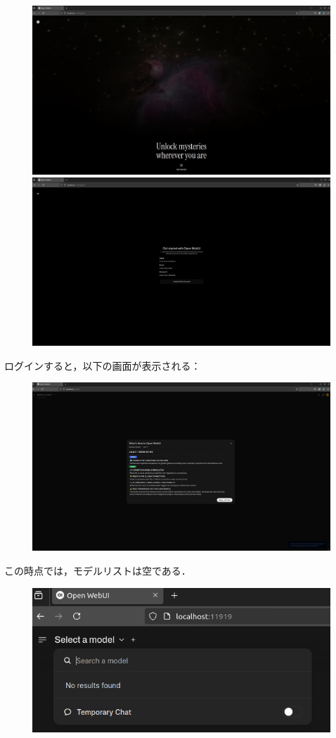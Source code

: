 \begin{figure}[H]
    \centering
    \includegraphics[width=0.8\linewidth]{images/Pasted image 20250304171521.png}
    \includegraphics[width=0.8\linewidth]{images/Pasted image 20250304171548.png}
\end{figure}

ログインすると，以下の画面が表示される：
\begin{figure}[H]
    \centering
    \includegraphics[width=0.8\linewidth]{images/Pasted image 20250304171722.png}
\end{figure}

この時点では，モデルリストは空である．

\begin{figure}[H]
    \centering
    \includegraphics[width=0.8\linewidth]{images/Pasted image 20250304171753.png}
\end{figure}

